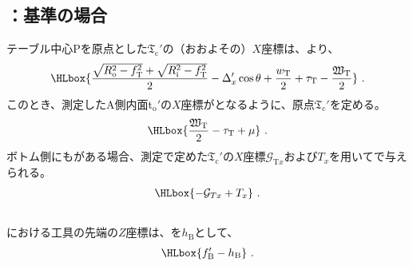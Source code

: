 \subsection{\OutcutCenter：\TopOutcutAsideThickness 基準の場合}
テーブル中心Pを原点とした\TopOutcutCenter$\mathfrak T_\mathrm c'$の（おおよその）$X$座標は、より、
\begin{align*}
  \HLbox{%
    \frac{\sqrt{R_\mathrm o^2-f_\mathrm T^2}+\sqrt{R_\mathrm i^2-f_\mathrm T^2}}2
    -\Delta_x'\cos\theta
    +\frac{w_\mathrm T}2
    +\tau_\mathrm T
    -\frac{\mathfrak W_\mathrm T}2
  }\ .
\end{align*}
このとき、測定したA側内面t$_\mathrm o'$の$X$座標がとなるように、原点$\mathfrak T_\mathrm c'$を定める。
\begin{align*}
  \HLbox{\frac{\mathfrak W_\mathrm T}2-\tau_\mathrm T+\mu}~.
\end{align*}
ボトム側にも\Outcut がある場合、測定で定めた$\mathfrak T_\mathrm c'$の$X$座標$\mathcal G_{\mathrm Tx}$および\CenterlineEndFaceDifAC$T_x$を用いてで与えられる。
\begin{align*}
  \HLbox{-\mathcal G_{Tx}+T_x}\ .
\end{align*}


\subsection{\OutcutLength}

\subsubsection{\BottomOutcutLength}
\BottomOutcut における工具の先端の$Z$座標は、\BottomOutcutLength を$h_\mathrm B$として、
\begin{align*}
  \HLbox{f_\mathrm B'-h_\mathrm B}\ .
\end{align*}

